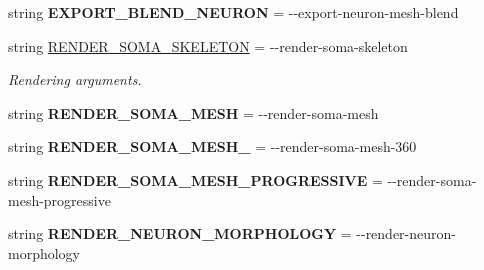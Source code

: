 \begin{DoxyCompactItemize}
\item 
string {\bfseries E\+X\+P\+O\+R\+T\+\_\+\+B\+L\+E\+N\+D\+\_\+\+N\+E\+U\+R\+ON} = \textquotesingle{}-\/-\/export-\/neuron-\/mesh-\/blend\textquotesingle{}\hypertarget{classmeshy_1_1neuromorphovis_1_1interface_1_1cli_1_1args_1_1Args_ab0f924b4458ee6e7c6163aebd37324b2}{}\label{classmeshy_1_1neuromorphovis_1_1interface_1_1cli_1_1args_1_1Args_ab0f924b4458ee6e7c6163aebd37324b2}

\item 
string \hyperlink{classmeshy_1_1neuromorphovis_1_1interface_1_1cli_1_1args_1_1Args_aef51611c3bbfab78543a4dd8b8993c2a}{R\+E\+N\+D\+E\+R\+\_\+\+S\+O\+M\+A\+\_\+\+S\+K\+E\+L\+E\+T\+ON} = \textquotesingle{}-\/-\/render-\/soma-\/skeleton\textquotesingle{}
\begin{DoxyCompactList}\small\item\em Rendering arguments. \end{DoxyCompactList}\item 
string {\bfseries R\+E\+N\+D\+E\+R\+\_\+\+S\+O\+M\+A\+\_\+\+M\+E\+SH} = \textquotesingle{}-\/-\/render-\/soma-\/mesh\textquotesingle{}\hypertarget{classmeshy_1_1neuromorphovis_1_1interface_1_1cli_1_1args_1_1Args_a39fc94a5f9b75c777345e06b69581c55}{}\label{classmeshy_1_1neuromorphovis_1_1interface_1_1cli_1_1args_1_1Args_a39fc94a5f9b75c777345e06b69581c55}

\item 
string {\bfseries R\+E\+N\+D\+E\+R\+\_\+\+S\+O\+M\+A\+\_\+\+M\+E\+S\+H\+\_} = \textquotesingle{}-\/-\/render-\/soma-\/mesh-\/360\textquotesingle{}\hypertarget{classmeshy_1_1neuromorphovis_1_1interface_1_1cli_1_1args_1_1Args_a42438b8acd0289ba56c5a169de286efe}{}\label{classmeshy_1_1neuromorphovis_1_1interface_1_1cli_1_1args_1_1Args_a42438b8acd0289ba56c5a169de286efe}

\item 
string {\bfseries R\+E\+N\+D\+E\+R\+\_\+\+S\+O\+M\+A\+\_\+\+M\+E\+S\+H\+\_\+\+P\+R\+O\+G\+R\+E\+S\+S\+I\+VE} = \textquotesingle{}-\/-\/render-\/soma-\/mesh-\/progressive\textquotesingle{}\hypertarget{classmeshy_1_1neuromorphovis_1_1interface_1_1cli_1_1args_1_1Args_a938fc43ed5d6dbfbc80909cb21164054}{}\label{classmeshy_1_1neuromorphovis_1_1interface_1_1cli_1_1args_1_1Args_a938fc43ed5d6dbfbc80909cb21164054}

\item 
string {\bfseries R\+E\+N\+D\+E\+R\+\_\+\+N\+E\+U\+R\+O\+N\+\_\+\+M\+O\+R\+P\+H\+O\+L\+O\+GY} = \textquotesingle{}-\/-\/render-\/neuron-\/morphology\textquotesingle{}\hypertarget{classmeshy_1_1neuromorphovis_1_1interface_1_1cli_1_1args_1_1Args_ae34e1eb779faccc54d1a2fab9ec01a7f}{}\label{classmeshy_1_1neuromorphovis_1_1interface_1_1cli_1_1args_1_1Args_ae34e1eb779faccc54d1a2fab9ec01a7f}


\end{DoxyCompactItemize}
